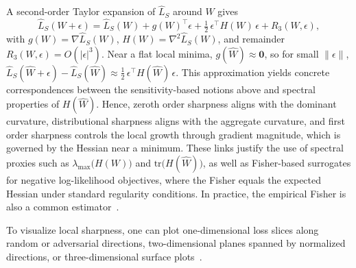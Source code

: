 \documentclass{article} %
\begin{document}
A second-order Taylor expansion of $ \hat{L}_S$ around $W$ gives
$$ \hat{L}_S(W+\epsilon) =  \hat{L}_S(W) + g(W)^{\top}{\epsilon} + \tfrac12\,{\epsilon}^{\top}H(W)\,{\epsilon} + R_3(W,{\epsilon}),$$
with $g(W)=\nabla \hat L_S(W)$, $H(W)=\nabla^2 \hat L_S(W)$, and remainder $R_3(W,{\epsilon})=O(|{\epsilon}|^3)$.
Near a flat local minima, $g(\hat{W})\approx \mathbf 0$, so for small $\|{\epsilon}\|$,
$
\hat{L}_S(\hat{W}+{\epsilon})-\hat{L}_S(\hat{W})
\approx \tfrac12\,{\epsilon}^{\top}H(\hat{W})\,{\epsilon}.
$
This approximation yields concrete correspondences between the sensitivity-based notions above and spectral properties of $H(\hat{W})$.
Hence, zeroth order sharpness aligns with the dominant curvature, distributional sharpness aligns with the aggregate curvature, and first order sharpness controls the local growth through gradient magnitude, which is governed by the Hessian near a minimum. These links justify the use of spectral proxies such as $\lambda_{\max}\big(H(W)\big)$ and $\mathrm{tr}\big(H(\hat{W})\big)$, as well as Fisher-based surrogates for negative log-likelihood objectives, where the Fisher equals the expected Hessian under standard regularity conditions. In practice, the empirical Fisher is also a common estimator~\cite{dinhSharpMinimaCan2017,caoTradeoffFlatnessOptimization2024,tsuzukuNormalizedFlatMinima2020,miMakeSharpnessAwareMinimization2022}.

To visualize local sharpness, one can plot one-dimensional loss slices along random or adversarial directions, two-dimensional planes spanned by normalized directions, or three-dimensional surface plots~\cite{goodfellowQualitativelyCharacterizingNeural2015,izmailovAveragingWeightsLeads2019,chaSWADDomainGeneralization2021,liVisualizingLossLandscape2018}.
\end{document}
